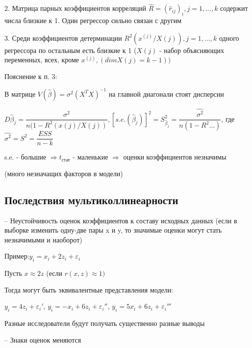 \documentclass{article}
\begin{document}
\vspace{1mm}
2. Матрица парных коэффициентов корреляций $\hat{R} = (\hat{r}_{ij})_i,j = 1, ... , k$ содержит числа близкие к 1. Один регрессор сильно связан с другим \par

\vspace{1mm}
3. Среди коэффициентов детерминации $R^2 (x^{(j)} / X(j)), j = 1, ..., k$ одного регрессора по остальным есть близкие к 1 ($X(j)$ - набор объясняющих переменных, всех, кроме $x^{(j)}, (dimX(j) = k-1))$\par

\begin{tcolorbox}
Пояснение к п. 3: \par
В матрице $V(\hat{\beta}) = \sigma^2(X^TX)^{-1}$ на главной диагонали стоят дисперсии \par 
$D\hat{\beta}_j = \dfrac{\sigma^2}{n(1-R^2(x(j) / X(j))}, [s.e.(\hat{\beta}_j)]^2 = S^2_{\hat{\beta}_j} = \dfrac{\hat{\sigma^2}}{n(1-R^2 ... )}$, где $\hat{\sigma^2} = S^2 = \dfrac{ESS}{n-k}$ \par 
s.e. - большие $\Longrightarrow t_\text{стат}$ - маленькие $\Longrightarrow$ оценки коэффициентов незначимы \par (много незначащих факторов в модели)
\end{tcolorbox}

\subsection{Последствия мультиколлинеарности}

\vspace{1mm}
-- Неустойчивость оценок коэффициентов к составу исходных данных (если в выборке изменить одну-две пары x и y, то значимые оценки могут стать незначимыми и наоборот)\par
\begin{tcolorbox}
Пример:$y_i = x_i + 2z_i + \varepsilon_i$\par
Пусть $x \approx 2z$ (если $r(x,z) \approx 1)$\par
Тогда могут быть эквивалентные представления модели:\par
$y_i = 4z_i + \varepsilon_i'$, $y_i = -x_i + 6z_i + \varepsilon_i''$, $y_i = 5x_i + 6z_i + \varepsilon_i'''$\par
Разные исследователи будут получать существенно разные выводы
\end{tcolorbox}
    
\vspace{1mm}
-- Знаки оценок меняются
\end{document}
